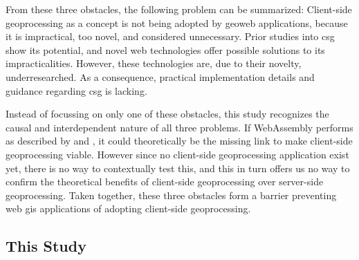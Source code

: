 
From these three obstacles, the following problem can be summarized: 
Client-side geoprocessing as a concept is not being adopted by geoweb applications, because it is impractical, too novel, and considered unnecessary. 
Prior studies into \ac{csg} show its potential, and novel web technologies offer possible solutions to its impracticalities. However, these technologies are, due to their novelty, underresearched. As a consequence,  practical implementation details and guidance regarding \ac{csg} is lacking.

Instead of focussing on only one of these obstacles, this study recognizes the causal and interdependent nature of all three problems. If WebAssembly performs as described by \cite{haas_bringing_2017} and \cite{jangda_not_2019}, it could theoretically be the missing link to make client-side geoprocessing viable. However since no client-side geoprocessing application exist yet, there is no way to contextually test this, and this in turn offers us no way to confirm the theoretical benefits of client-side geoprocessing over server-side geoprocessing. Taken together, these three obstacles form a barrier preventing web \ac{gis} applications of adopting client-side geoprocessing. 

\subsection{This Study}

